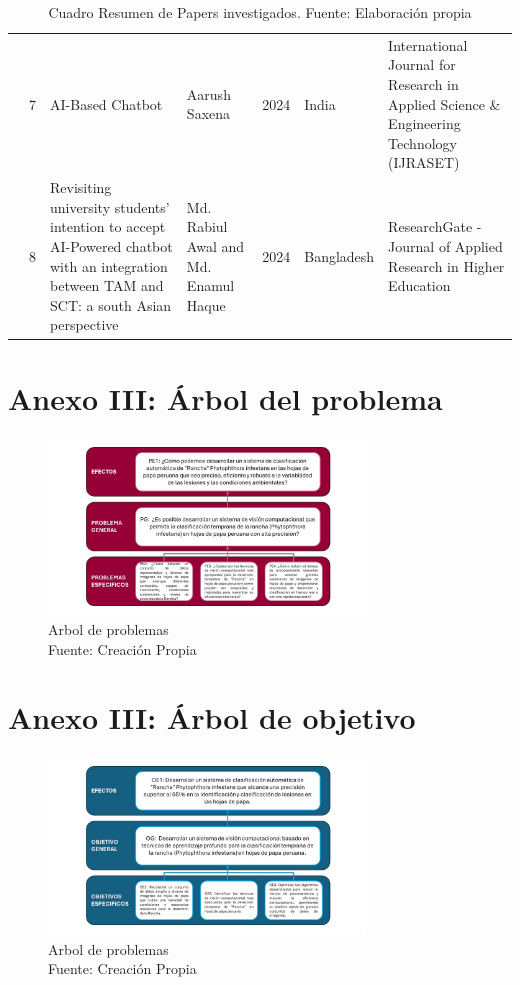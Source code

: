 \begin{table}[H]
\begin{tabular}{|m{0.5cm}|m{0.3cm}|m{4cm}|m{2cm}|m{0.6cm}|m{1.7cm}|m{3cm}|}
		& 7        
		& AI-Based Chatbot
		& Aarush Saxena
		& 2024
		& India
		& International Journal for Research in Applied Science \& Engineering Technology (IJRASET) \\ 

		\cline{2-7}

		& 8        
		& Revisiting university students’ intention to accept AI-Powered chatbot with an integration between TAM and SCT: a south Asian perspective
		& Md. Rabiul Awal and Md. Enamul Haque
		& 2024
		& Bangladesh
		& ResearchGate - Journal of Applied Research in
		Higher Education \\ 
		\hline
	\end{tabular}
	\caption{Cuadro Resumen de Papers investigados. Fuente: Elaboración propia}
\label{A:table}
\end{table}


\chapter{Anexo III: Árbol del problema}

\begin{figure}[H]
	\begin{center}
		\includegraphics[width=0.75\textwidth]{anexos/arbol_problema.jpg}
		\caption{Arbol de problemas 
		\\Fuente: Creación Propia}
		\label{anexos:arbol_problema}
	\end{center}
\end{figure}

\chapter{Anexo III: Árbol de objetivo}

\begin{figure}[H]
	\begin{center}
		\includegraphics[width=0.75\textwidth]{anexos/arbol_objetivos.jpg}
		\caption{Arbol de problemas 
			\\Fuente: Creación Propia}
		\label{anexos:arbol_objetivo}
	\end{center}
\end{figure}
